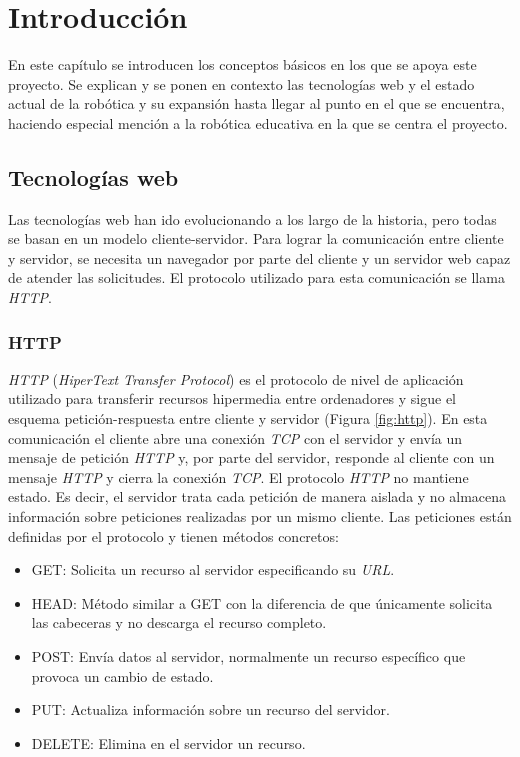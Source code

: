 
\chapter{Introducción}
\label{chap:intro} 
En este capítulo se introducen los conceptos básicos en los que se apoya este proyecto. Se explican y se ponen en contexto las tecnologías web y el estado actual de la robótica y su expansión hasta llegar al punto en el que se encuentra, haciendo especial mención a la robótica educativa en la que se centra el proyecto.
   
\section{Tecnologías web}
\label{sec:web}
Las tecnologías web han ido evolucionando a los largo de la historia, pero todas se basan en un modelo cliente-servidor. Para lograr la comunicación entre cliente y servidor, se necesita un navegador por parte del cliente y un servidor web capaz de atender las solicitudes. El protocolo utilizado para esta comunicación se llama \textit{HTTP}.

\subsection{HTTP}
\label{subsec:http}
\textit{HTTP} (\textit{HiperText Transfer Protocol}) es el protocolo de nivel de aplicación utilizado para transferir recursos hipermedia entre ordenadores y sigue el esquema petición-respuesta entre cliente y servidor (Figura \ref{fig:http}). En esta comunicación el cliente abre una conexión \textit{TCP} con el servidor y envía un mensaje de petición \textit{HTTP} y, por parte del servidor, responde al cliente con un mensaje \textit{HTTP} y cierra la conexión \textit{TCP}. 
El protocolo \textit{HTTP} no mantiene estado. Es decir, el servidor trata cada petición de manera aislada y no almacena información sobre peticiones realizadas por un mismo cliente. 
Las peticiones están definidas por el protocolo y tienen métodos concretos: 
\begin{itemize}
    \item GET: Solicita un recurso al servidor especificando su \textit{URL}.
    \item HEAD: Método similar a GET con la diferencia de que únicamente solicita las cabeceras y no descarga el recurso completo.
    \item POST: Envía datos al servidor, normalmente un recurso específico que provoca un cambio de estado. 
    \item PUT: Actualiza información sobre un recurso del servidor. 
    \item DELETE: Elimina en el servidor un recurso.
\end{itemize}

